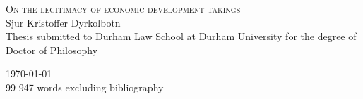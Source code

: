 \begin{titlepage}

\begin{center}



\vspace*{\fill}
\centering

{\Huge\textsc{On the legitimacy of economic development takings}}\\[3cm]


{\huge Sjur Kristoffer Dyrkolbotn}\\

\large {Thesis submitted to Durham Law School at Durham University for the degree of Doctor of Philosophy} \\

\vspace*{\fill}

 

\vfill

{\Large \today}\\
{99 947 words excluding bibliography}

\end{center}

\end{titlepage}
